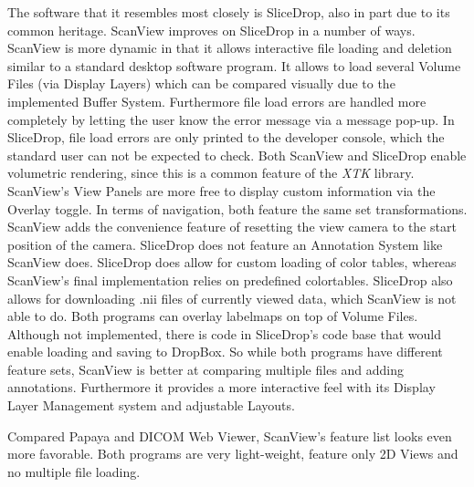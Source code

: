 \documentclass[a4paper,11pt,twoside]{article}
\begin{document}
The software that it resembles most closely is SliceDrop, also in part due to its common heritage. ScanView improves on SliceDrop in a number of ways. ScanView is more dynamic in that it allows interactive file loading and deletion similar to a standard desktop software program. It allows to load several Volume Files (via Display Layers) which can be compared visually due to the implemented Buffer System. Furthermore file load errors are handled more completely by letting the user know the error message via a message pop-up. In SliceDrop, file load errors are only printed to the developer console, which the standard user can not be expected to check. Both ScanView and SliceDrop enable volumetric rendering, since this is a common feature of the \textit{XTK} library. ScanView's View Panels are more free to display custom information via the Overlay toggle. In terms of navigation, both feature the same set transformations. ScanView adds the convenience feature of resetting the view camera to the start position of the camera. SliceDrop does not feature an Annotation System like ScanView does. SliceDrop does allow for custom loading of color tables, whereas ScanView's final implementation relies on predefined colortables. SliceDrop also allows for downloading .nii files of currently viewed data, which ScanView is not able to do. Both programs can overlay labelmaps on top of Volume Files. Although not implemented, there is code in SliceDrop's code base that would enable loading and saving to DropBox. So while both programs have different feature sets, ScanView is better at comparing multiple files and adding annotations. Furthermore it provides a more interactive feel with its Display Layer Management system and adjustable Layouts.

Compared Papaya and DICOM Web Viewer, ScanView's feature list looks even more favorable. Both programs are very light-weight, feature only 2D Views and no multiple file loading. 
\end{document}
